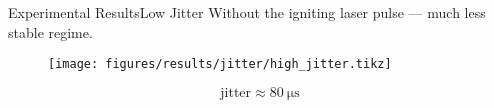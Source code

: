 \documentclass[dvipsnames]{beamer}
\begin{document}
%
\begin{frame}{Experimental Results}{Low Jitter}
Without the igniting laser pulse --- much less stable regime.
\begin{figure}
 \texttt{[image: figures/results/jitter/high\_jitter.tikz]}
\end{figure}
$$\text{jitter}\approx \SI{80}{\us}$$
\end{frame}
\end{document}
